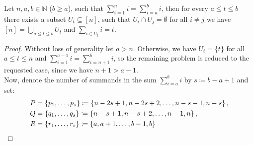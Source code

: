\begin{thm}\label{theorem11}
Let \(n,a,b\in\mathbb{N}\) (\(b\geq a\)), such that \(\sum\limits_{i=1}^ni=\sum\limits_{i=a}^bi\), then for every \(a\leq t\leq b\) there exists a subset \(U_t\subseteq [n]\), such that \(U_i\cap U_j=\emptyset\) for all \(i\neq j\) we have\\
\([n]=\bigcup\limits_{a\leq t\leq b}U_t\) and \(\sum\limits_{i\in U_t}i=t\).
\begin{proof}
Without loss of generality let \(a>n\). Otherwise, we have \(U_t=\{t\}\) for all \(a\leq t\leq n\) and \(\sum\limits_{i=1}^{a-1}i=\sum\limits_{i=n+1}^bi\), so the remaining problem is reduced to the requested case, since we have \(n+1>a-1\).\\
Now, denote the number of summands in the sum \(\sum\limits_{i=a}^bi\) by \(s\coloneqq b-a+1\) and set:
\begin{align}
P&=\left\{p_1,\ldots,p_s\right\}\coloneqq \left\{n-2s+1,n-2s+2,\ldots,n-s-1,n-s\right\},\notag\\
Q&=\left\{q_1,\ldots,q_s\right\}\coloneqq \left\{n-s+1,n-s+2,\ldots,n-1,n\right\},\notag\\
R&=\left\{r_1,\ldots,r_s\right\}\coloneqq \left\{a,a+1,\ldots,b-1,b\right\}\notag
\end{align}

\end{proof}
\end{thm}
